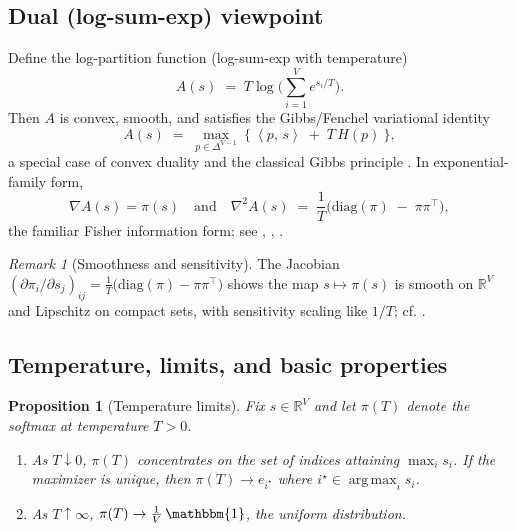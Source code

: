 \documentclass[10pt,a4paper]{amsart}
\numberwithin{equation}{section}
\theoremstyle{plain}
\newtheorem{proposition}[theorem]{Proposition}
\theoremstyle{definition}
\theoremstyle{remark}
\newtheorem{remark}[theorem]{Remark}
\DeclareMathOperator*{\argmax}{arg\,max}
\newcommand{\R}{\mathbb{R}}
\newcommand{\1}{\mathbbm{1}}
\newcommand{\ip}[2]{\left\langle #1,\, #2 \right\rangle}
\newcommand{\Hent}{H}
\newcommand{\simplex}{\Delta^{V-1}}
\begin{document}
\subsection{Dual (log-sum-exp) viewpoint}
Define the log-partition function (log-sum-exp with temperature)
\begin{equation}\label{eq:logZ}
A(s)\;=\;T\log\!\Big(\sum_{i=1}^V e^{s_i/T}\Big).
\end{equation}
Then $A$ is convex, smooth, and satisfies the Gibbs/Fenchel variational identity
\begin{equation}\label{eq:duality}
A(s)\;=\;\max_{p\in\simplex}\ \Big\{\ \ip{p}{s} \;+\; T\,\Hent(p)\ \Big\},
\end{equation}
a special case of convex duality \citep[cf.][]{rockafellar1970convex} and the classical Gibbs principle \citep{jaynes1957information,cover2006elements}. In exponential-family form,
\[
\nabla A(s)=\pi(s)\quad\text{and}\quad
\nabla^2 A(s)\;=\;\frac{1}{T}\Big(\mathrm{diag}(\pi)\;-\;\pi\pi^\top\Big),
\]
the familiar Fisher information form; see \citet[§3]{wainwright2008graphical}, \citet[§8.3]{murphy2012ml}, \citet[§4.3]{bishop2006pattern}.

\begin{remark}[Smoothness and sensitivity]
The Jacobian $(\partial \pi_i/\partial s_j)_{ij}=\frac{1}{T}\big(\mathrm{diag}(\pi)-\pi\pi^\top\big)$ shows the map $s\mapsto \pi(s)$ is smooth on $\R^V$ and Lipschitz on compact sets, with sensitivity scaling like $1/T$; cf. \citet[§8.3]{murphy2012ml}.
\end{remark}

\subsection{Temperature, limits, and basic properties}
\begin{proposition}[Temperature limits]\label{prop:temperature-limits}
Fix $s\in\R^V$ and let $\pi(T)$ denote the softmax at temperature $T>0$.
\begin{enumerate}
\item As $T\downarrow 0$, $\pi(T)$ concentrates on the set of indices attaining $\max_i s_i$. If the maximizer is unique, then $\pi(T)\to e_{i^\star}$ where $i^\star\in\argmax_i s_i$.
\item As $T\uparrow \infty$, $\pi(T)\to \tfrac{1}{V}\,\1$, the uniform distribution.
\end{enumerate}
\end{proposition}
\end{document}

